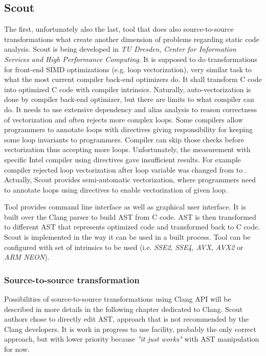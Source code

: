 \subsection{Scout}
\label{scout}
The first, unfortunately also the last, tool that does also source-to-source transformations what create another dimension of problems regarding static code analysis. Scout is being developed in \emph{TU Dresden}, \emph{Center for Information Services and High Performance Computing}. It is supposed to do transformations for front-end SIMD optimizations (e.g. loop vectorization), very similar task to what the most current compiler back-end optimizers do. It shall transform C code into optimized C code with compiler intrinsics. Naturally, auto-vectorization is done by compiler back-end optimizer, but there are limits to what compiler can do. It needs to use extensive dependency and alias analysis to reason correctness of vectorization and often rejects more complex loops. Some compilers allow programmers to annotate loops with  directives giving responsibility for keeping some loop invariants to programmers. Compiler can skip those checks before vectorization thus accepting more loops. Unfortunately, the measurement with specific Intel compiler using  directives gave insufficient results. For example compiler rejected loop vectorization after loop variable was changed from  to . Actually, Scout provides semi-automatic vectorization, where programmers need to annotate loops using  directives to enable vectorization of given loop. 

Tool provides command line interface as well as graphical user interface. It is built over the Clang parser to build AST from C code. AST is then transformed to different AST that represents optimized code and transformed back to C code. Scout is implemented in the way it can be used in a built process. Tool can be configured with set of intrinsics to be used (i.e. \emph{SSE2}, \emph{SSE4}, \emph{AVX}, \emph{AVX2} or \emph{ARM NEON}).

\subsubsection{Source-to-source transformation}
Possibilities of source-to-source transformations using Clang API will be described in more details in the following chapter dedicated to Clang. Scout authors chose to directly edit AST, approach that is not recommended by the Clang developers. It is work in progress to use  facility, probably the only correct approach, but with lower priority because \textit{"it just works"} with AST manipulation for now.

